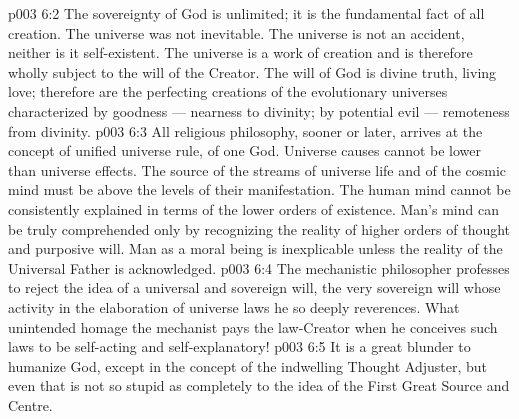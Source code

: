 \vs p003 6:2 The sovereignty of God is unlimited; it is the fundamental fact of all creation. The universe was not inevitable. The universe is not an accident, neither is it self\hyp{}existent. The universe is a work of creation and is therefore wholly subject to the will of the Creator. The will of God is divine truth, living love; therefore are the perfecting creations of the evolutionary universes characterized by goodness --- nearness to divinity; by potential evil --- remoteness from divinity.
\vs p003 6:3 \pc All religious philosophy, sooner or later, arrives at the concept of unified universe rule, of one God. Universe causes cannot be lower than universe effects. The source of the streams of universe life and of the cosmic mind must be above the levels of their manifestation. The human mind cannot be consistently explained in terms of the lower orders of existence. Man’s mind can be truly comprehended only by recognizing the reality of higher orders of thought and purposive will. Man as a moral being is inexplicable unless the reality of the Universal Father is acknowledged.
\vs p003 6:4 The mechanistic philosopher professes to reject the idea of a universal and sovereign will, the very sovereign will whose activity in the elaboration of universe laws he so deeply reverences. What unintended homage the mechanist pays the law\hyp{}Creator when he conceives such laws to be self\hyp{}acting and self\hyp{}explanatory!
\vs p003 6:5 It is a great blunder to humanize God, except in the concept of the indwelling Thought Adjuster, but even that is not so stupid as completely to  the idea of the First Great Source and Centre.
